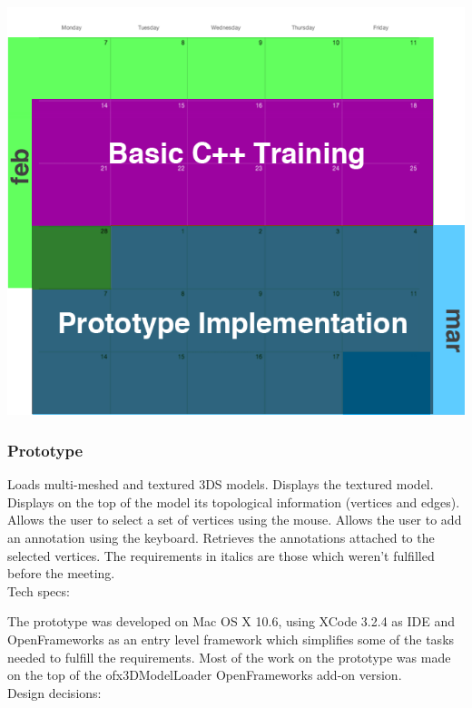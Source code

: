 \begin{center}
\includegraphics[scale=0.5]{Images/first_calendar.png}
\end{center}
\subsubsection{Prototype}

\hspace{6mm}{\large Requirements:}

Loads multi-meshed and textured 3DS models.
Displays the textured model.
Displays on the top of the model its topological information (vertices and edges).
Allows the user to select a set of vertices using the mouse.
Allows the user to add an annotation using the keyboard.
Retrieves the annotations attached to the selected vertices.
The requirements in italics are those which weren't fulfilled before the meeting.\\



{\large Tech specs:}

The prototype was developed on Mac OS X 10.6, using XCode 3.2.4 as IDE and OpenFrameworks as an entry level framework which simplifies some of the tasks needed to fulfill the requirements. Most of the work on the prototype was made on the top of the ofx3DModelLoader OpenFrameworks add-on version.\\

{\large Design decisions:}

